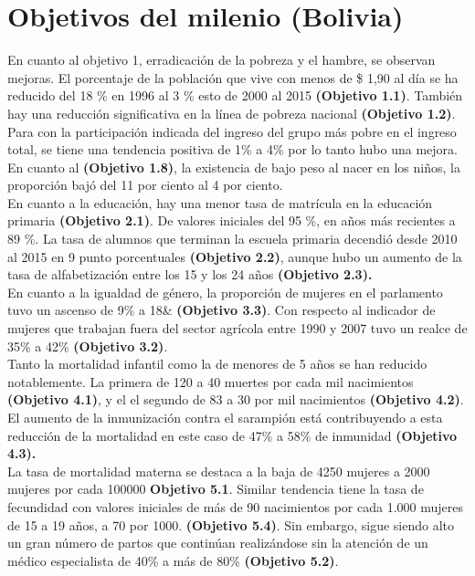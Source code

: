 \chapter{Objetivos del milenio (Bolivia)}

En cuanto al objetivo 1, erradicación de la pobreza y el hambre, se observan mejoras. El porcentaje de la población que vive con menos de \$ 1,90 al día se ha reducido del 18 \% en 1996 al 3 \% esto de 2000 al 2015 \textbf{(Objetivo 1.1)}. También hay una reducción significativa en la línea de pobreza nacional \textbf{(Objetivo 1.2)}. Para    con la participación indicada del ingreso del grupo más pobre en el ingreso total, se tiene una tendencia positiva de 1\% a 4\% por lo tanto  hubo una mejora. En cuanto al \textbf{(Objetivo 1.8)}, la existencia de bajo peso al nacer en los niños, la proporción bajó del 11 por ciento al 4 por ciento.\\
En cuanto a la educación, hay una menor tasa de matrícula en la educación primaria \textbf{(Objetivo 2.1)}. De valores iniciales del 95  \%, en años más recientes a 89 \%. La tasa de alumnos que terminan la escuela primaria decendió desde 2010 al 2015 en 9 punto porcentuales \textbf{(Objetivo 2.2)}, aunque hubo un aumento de la tasa de alfabetización entre los 15 y los 24 años \textbf{(Objetivo 2.3).}\\
En cuanto a la igualdad de género, la proporción de mujeres en el parlamento tuvo un  ascenso de 9\% a 18\& \textbf{(Objetivo 3.3)}. Con respecto al indicador de mujeres que trabajan fuera del sector agrícola entre 1990 y 2007 tuvo un realce de 35\% a 42\% \textbf{(Objetivo 3.2)}.\\
Tanto la mortalidad infantil como la de menores de 5 años se han reducido notablemente. La primera de 120 a 40 muertes por cada mil nacimientos \textbf{(Objetivo 4.1)}, y el el segundo de 83 a 30 por mil nacimientos \textbf{(Objetivo 4.2)}. El aumento de la inmunización contra el sarampión está contribuyendo a esta reducción de la mortalidad en este caso de 47\% a 58\% de inmunidad \textbf{(Objetivo 4.3).}\\
La tasa de mortalidad materna se destaca a la baja de 4250 mujeres a 2000 mujeres por cada 100000 \textbf{Objetivo 5.1}. Similar tendencia tiene la tasa de fecundidad con valores iniciales de más de 90 nacimientos por cada 1.000 mujeres de 15 a 19 años, a 70 por 1000. \textbf{(Objetivo 5.4)}. Sin embargo, sigue siendo alto un gran número de partos que continúan realizándose sin la atención de un médico  especialista de 40\% a más de 80\% \textbf{(Objetivo 5.2)}.\\
